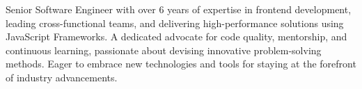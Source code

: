 

\begin{cvparagraph}

Senior Software Engineer with over 6 years of expertise in frontend development, leading cross-functional teams, and delivering high-performance solutions using JavaScript Frameworks. A dedicated advocate for code quality, mentorship, and continuous learning, passionate about devising innovative problem-solving methods. Eager to embrace new technologies and tools for staying at the forefront of industry advancements.

\end{cvparagraph}
